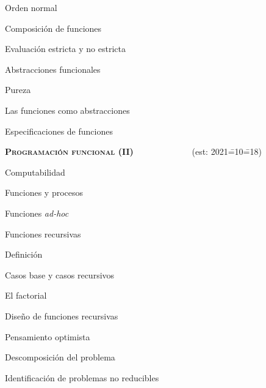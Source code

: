 \begin{longenum}
\begin{longenum}
\begin{longenum}
\begin{longenum}
\begin{longenum}
                    \item Orden normal
                \end{longenum}
                \item Composición de funciones
                \item Evaluación estricta y no estricta
            \end{longenum}
        \end{longenum}
        \item Abstracciones funcionales
        \begin{longenum}
            \item Pureza
            \item Las funciones como abstracciones
            \begin{longenum}
                \item Especificaciones de funciones
            \end{longenum}
        \end{longenum}
    \end{longenum}
    \item \textbf{\textsc{Programación funcional (II)}} \ \ \ \ \ \ \ \ \ \ \ \ \ (est: 2021\==10\==18)
    \begin{longenum}
        \item Computabilidad
        \begin{longenum}
            \item Funciones y procesos
            \item Funciones \textit{ad-hoc}
            \item Funciones recursivas
            \begin{longenum}
                \item Definición
                \item Casos base y casos recursivos
                \item El factorial
                \item Diseño de funciones recursivas
                \begin{longenum}
                    \item Pensamiento optimista
                    \item Descomposición del problema
                    \item Identificación de problemas no reducibles
                \end{longenum}

\end{longenum}
\end{longenum}
\end{longenum}
\end{longenum}
